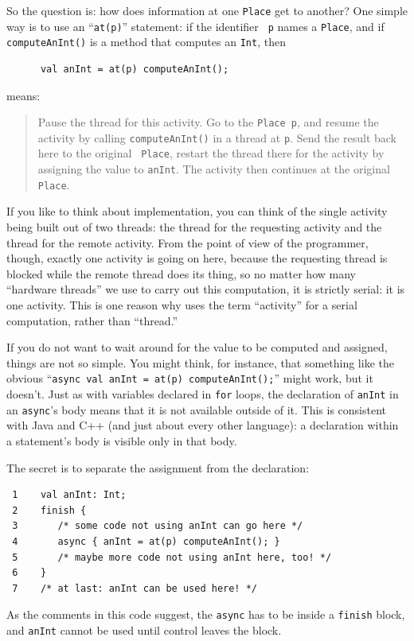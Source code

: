  So the question is: how does information at one {\tt Place} get to another? 
 One simple way is to use an ``{\tt at(p)}''  statement: if the identifier {\tt
 p} names a {\tt Place}, and if {\tt compute\-An\-Int()} is a method that
 computes an {\tt Int}, then
 \begin{verbatim}
      val anInt = at(p) computeAnInt();
 \end{verbatim} 
 means: 
 \begin{quote}
 Pause the thread for this activity.  Go to the {\tt Place p}, and resume the activity
 by calling {\tt compute\-An\-Int()} in a thread at {\tt p}. 
 Send the result back here to the original {\tt
 Place}, restart the thread there for the activity by assigning the value to {\tt anInt}.
 The activity then continues at the original {\tt Place}.
 \end{quote}
 If you like to think about implementation, you can think of the single
 \Xten{} activity being built out of two threads: the thread for the requesting
 activity and the thread for the remote activity. From the point of view
 of the \Xten{} programmer, though, exactly one activity is going on here,
 because the requesting thread is blocked
 while the remote thread does its thing, so no matter how many ``hardware
 threads'' we use to carry out this computation, it is strictly serial:
 it is one activity. This is one reason why \Xten{} uses the term
 ``activity'' for a serial computation, rather than ``thread.''
 
 If you do not want to wait around for the value to be computed and assigned,
 things are not so simple.  You might think, for instance,
 that something like the obvious ``{\tt async val anInt =  at(p) computeAnInt();}''
 might work, but it doesn't.   Just as with variables declared in {\tt for}  loops,
 the declaration of {\tt anInt} 
 in an {\tt async}'s body means that it is not available outside of it.  This
 is consistent with Java and C++ (and just about every other language): a
 declaration within a statement's body is visible only in that body.
 
The secret is to separate the assignment from the declaration:
 \begin{verbatim}
 1    val anInt: Int;
 2    finish { 
 3       /* some code not using anInt can go here */
 4       async { anInt = at(p) computeAnInt(); }
 5       /* maybe more code not using anInt here, too! */
 6    }
 7    /* at last: anInt can be used here! */
 \end{verbatim} 
As the comments in this code suggest, the {\tt async} has to be inside a
 {\tt finish} block, and  {\tt anInt} cannot be used until control leaves the block.
 
